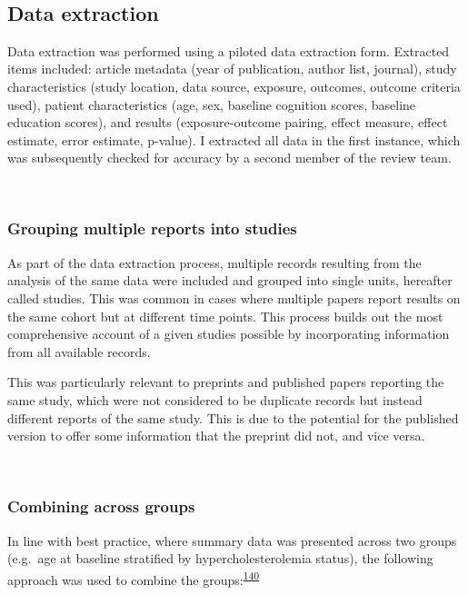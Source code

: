\documentclass[a4paper, twoside]{templates/ociamthesis}
\begin{document}
~

\hypertarget{data-extraction}{%
\subsection{Data extraction}\label{data-extraction}}

Data extraction was performed using a piloted data extraction form. Extracted items included: article metadata (year of publication, author list, journal), study characteristics (study location, data source, exposure, outcomes, outcome criteria used), patient characteristics (age, sex, baseline cognition scores, baseline education scores), and results (exposure-outcome pairing, effect measure, effect estimate, error estimate, p-value). I extracted all data in the first instance, which was subsequently checked for accuracy by a second member of the review team.

~

\hypertarget{grouping-multiple-reports-into-studies}{%
\subsubsection{Grouping multiple reports into studies}\label{grouping-multiple-reports-into-studies}}

As part of the data extraction process, multiple records resulting from the analysis of the same data were included and grouped into single units, hereafter called studies. This was common in cases where multiple papers report results on the same cohort but at different time points. This process builds out the most comprehensive account of a given studies possible by incorporating information from all available records.

This was particularly relevant to preprints and published papers reporting the same study, which were not considered to be duplicate records but instead different reports of the same study. This is due to the potential for the published version to offer some information that the preprint did not, and vice versa.

~

\hypertarget{combining-across-groups}{%
\subsubsection{Combining across groups}\label{combining-across-groups}}

In line with best practice, where summary data was presented across two groups (e.g.~age at baseline stratified by hypercholesterolemia status), the following approach was used to combine the groups:\textsuperscript{\protect\hyperlink{ref-higgins2019}{140}}
\end{document}
